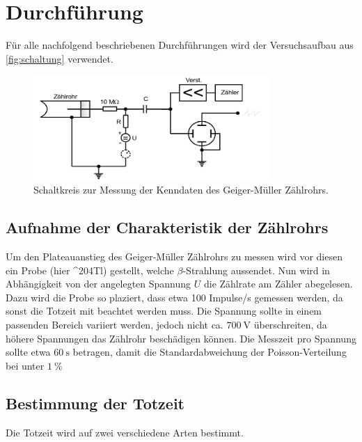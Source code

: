 \section{Durchführung}
\label{sec:Durchführung}

Für alle nachfolgend beschriebenen Durchführungen wird der Versuchsaufbau aus \autoref{fig:schaltung} verwendet.

\begin{figure}
    \centering
    \includegraphics[width=0.8\textwidth]{images/skizze_4.png}
    \caption{Schaltkreis zur Messung der Kenndaten des Geiger-Müller Zählrohrs.\cite{V703}}
    \label{fig:schaltung}
\end{figure}

\subsection{Aufnahme der Charakteristik der Zählrohrs}
\label{ssec:charakteristik_durchführung}

Um den Plateauanstieg des Geiger-Müller Zählrohrs zu messen wird vor diesen ein Probe (hier ^{204}Tl) gestellt, welche $\beta$-Strahlung aussendet.
Nun wird in Abhängigkeit von der angelegten Spannung $U$ die Zählrate am Zähler abegelesen.
Dazu wird die Probe so plaziert, dass etwa 100 Impulse/s gemessen werden, da sonst die Totzeit mit beachtet werden muss.
Die Spannung sollte in einem passenden Bereich variiert werden, jedoch nicht ca. $\SI{700}{\volt}$ überschreiten, da höhere Spannungen das Zählrohr beschädigen können.
Die Messzeit pro Spannung sollte etwa $\SI{60}{\second}$ betragen, damit die Standardabweichung der Poisson-Verteilung bei unter $\SI{1}{\percent}$

\subsection{Bestimmung der Totzeit}
\label{ssec:totzeit_durchführung}

Die Totzeit wird auf zwei verschiedene Arten bestimmt.

